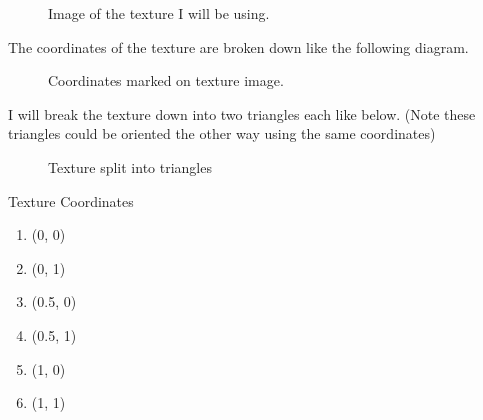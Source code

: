 \documentclass[10pt]{report}
\begin{document}
\begin{figure}[H]
    \centering
    \caption{Image of the texture I will be using.}
\end{figure}

The coordinates of the texture are broken down like the following diagram.
\begin{figure}[H]
    \centering
    \caption{Coordinates marked on texture image.}
\end{figure}

I will break the texture down into two triangles each like below. (Note these triangles could be oriented the other way using the same coordinates)
\begin{figure}[H]
    \centering
    \caption{Texture split into triangles}
\end{figure}


Texture Coordinates
\begin{enumerate}[(1)]
    \item (0, 0)
    \item (0, 1)
    \item (0.5, 0)
    \item (0.5, 1)
    \item (1, 0)
    \item (1, 1)
\end{enumerate}
\end{document}
